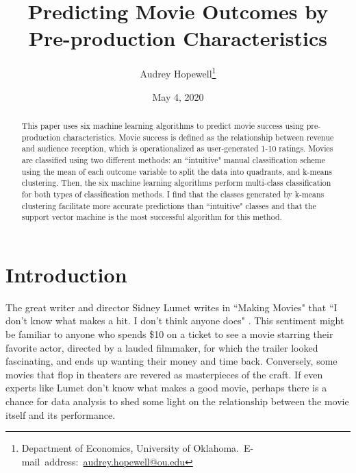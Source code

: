 \documentclass[12pt,english]{article}
\begin{document}
\begin{singlespace}
\title{Predicting Movie Outcomes by Pre-production Characteristics}
\end{singlespace}

\author{Audrey Hopewell\thanks{Department of Economics, University of Oklahoma.\
E-mail~address:~\href{mailto:audrey.hopewell@ou.edu}{audrey.hopewell@ou.edu}}}
\date{May 4, 2020}




\maketitle
\begin{singlespace}
\begin{abstract}
    This paper uses six machine learning algorithms to predict movie success using pre-production characteristics. Movie success is defined as the relationship between revenue and audience reception, which is operationalized as user-generated 1-10 ratings. Movies are classified using two different methods: an ``intuitive" manual classification scheme using the mean of each outcome variable to split the data into quadrants, and k-means clustering. Then, the six machine learning algorithms perform multi-class classification for both types of classification methods. I find that the classes generated by k-means clustering facilitate more accurate predictions than ``intuitive" classes and that the support vector machine is the most successful algorithm for this method.
\end{abstract}
\end{singlespace}

\newpage
\section{Introduction}
The great writer and director Sidney Lumet writes in ``Making Movies" that ``I don't know what makes a hit. I don't think anyone does" \citep[pp. 198]{lumet}. This sentiment might be familiar to anyone who spends \$10 on a ticket to see a movie starring their favorite actor, directed by a lauded filmmaker, for which the trailer looked fascinating, and ends up wanting their money and time back. Conversely, some movies that flop in theaters are revered as masterpieces of the craft. If even experts like Lumet don't know what makes a good movie, perhaps there is a chance for data analysis to shed some light on the relationship between the movie itself and its performance.
\end{document}

